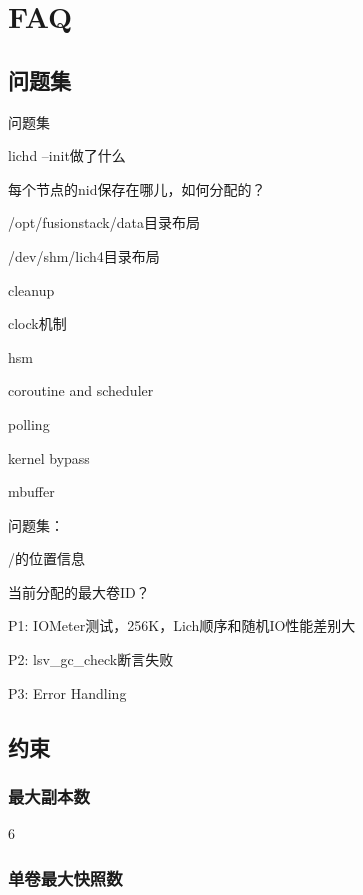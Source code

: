 \chapter{FAQ}

\section{问题集}

问题集
\begin{enumbox}
\item lichd --init做了什么
\item 每个节点的nid保存在哪儿，如何分配的？
\item /opt/fusionstack/data目录布局
\item /dev/shm/lich4目录布局
\item cleanup
\item clock机制
\item hsm
\end{enumbox}

\begin{compactitem}
\item coroutine and scheduler
\item polling 
\item kernel bypass
\item mbuffer
\end{compactitem}

问题集：
\begin{enumbox}
\item /的位置信息
\item 当前分配的最大卷ID？
\end{enumbox}

P1: IOMeter测试，256K，Lich顺序和随机IO性能差别大

P2: lsv\_gc\_check断言失败

P3: Error Handling

\section{约束}

\subsection{最大副本数}

6

\subsection{单卷最大快照数}


